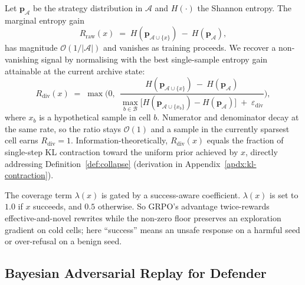 \documentclass{article}
\newcommand{\archive}{\mathcal{A}}
\newcommand{\strategyspace}{\mathcal{B}}
\newcommand{\archivedist}{\mathbf{p}_{\archive}}
\begin{document}
Let $\archivedist$ be the strategy distribution in $\archive$ and $H(\cdot)$ the Shannon entropy. The marginal entropy gain
\begin{equation}
  R_{\mathrm{raw}}(x) \;=\; H(\mathbf{p}_{\archive\cup\{x\}})\ -\ H(\archivedist),
\end{equation}
has magnitude $\mathcal{O}(1/|\archive|)$ and vanishes as training proceeds. We recover a non-vanishing signal by normalising with the best single-sample entropy gain attainable at the current archive state:
\begin{equation}
  R_{\mathrm{div}}(x) \;=\;
  \max \bigg(0,\ \ \frac{H(\mathbf{p}_{\archive\cup\{x\}})\ -\ H(\archivedist)}{\displaystyle\max_{b\in\strategyspace}\!\bigl[H(\mathbf{p}_{\archive\cup\{x_b\}})-H(\archivedist)\bigr]\;+\;\varepsilon_{\mathrm{div}}}\bigg),
  \label{eq:coverage-gain}
\end{equation}
where $x_b$ is a hypothetical sample in cell $b$. Numerator and denominator decay at the same rate, so the ratio stays $\mathcal{O}(1)$ and a sample in the currently sparsest cell earns $R_{\mathrm{div}}=1$. Information-theoretically, $R_{\mathrm{div}}(x)$ equals the fraction of single-step KL contraction toward the uniform prior achieved by $x$, directly addressing Definition~\ref{def:collapse} (derivation in Appendix~\ref{apdx:kl-contraction}).

The coverage term $\lambda(x)$ is gated by a success-aware coefficient. $\lambda(x)$ is set to $1.0$ if $x$ succeeds, and $0.5$ otherwise.
So GRPO's advantage twice-rewards effective-and-novel rewrites while the non-zero floor preserves an exploration gradient on cold cells; here ``success'' means an unsafe response on a harmful seed or over-refusal on a benign seed.


\subsection{Bayesian Adversarial Replay for Defender}
\label{sec:method-replay}
\end{document}
